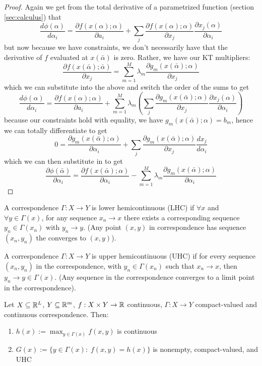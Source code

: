 \begin{proof}
  Again we get from the total derivative of a parametrized function (section
  \ref{sec:calculus}) that 
  \[
  \frac{d \phi(\alpha)}{d \alpha_i}
  = \frac{\partial f(x(\alpha); \alpha)}{\partial a_i}
  + \sum_j 
  \frac{\partial f(x(\alpha);\alpha)}{\partial x_j}
  \frac{\partial x_j(\alpha)}{\partial \alpha_i}
  \]
  but now because we have constraints, we don't necessarily have that
  the derivative of $f$ evaluated at $x(\bar \alpha)$ is zero. Rather,
  we have our KT multipliers:
  \[
  \frac{\partial f(x(\bar \alpha); \bar \alpha)}{\partial x_j}
  = \sum_{m=1}^M \lambda_m \frac{\partial g_m(x(\bar\alpha);\alpha)}{\partial x_j}
  \]
  which we can substitute into the above and switch the order of the
  sums to get
  \[
  \frac{d \phi(\alpha)}{d \alpha_i}
  = \frac{\partial f(x(\alpha); \alpha)}{\partial a_i}
  + \sum_{m=1}^M \lambda_m
  \left(
     \sum_j 
     \frac{\partial g_m(x(\bar\alpha);\alpha)}{\partial x_j}
     \frac{\partial x_j(\alpha)}{\partial \alpha_i}
  \right)
  \]
  because our constraints hold with equality, we have
  $g_m(x(\bar\alpha);\alpha) = b_m$, hence we can totally differentiate to get
  \[
  0 
  = \frac{\partial g_m(x(\bar\alpha);\alpha)}{\partial \alpha_i}
  + \sum_j 
  \frac{\partial g_m(x(\bar\alpha);\alpha)}{\partial x_j}
  \frac{dx_j}{d\alpha_i}
  \]
  which we can then substitute in to get
  \[
  \frac{\partial \phi(\bar \alpha)}{\partial \alpha_i}
  = \frac{\partial f(x(\bar\alpha);\alpha)}{\partial \alpha_i}
  - \sum_{m=1}^M\lambda_m 
  \frac{\partial g_m(x(\bar\alpha);\alpha)}{\partial \alpha_i}
  \]
\end{proof}

\begin{definition}[LHC]
  A correspondence $\Gamma:X \to Y$ is lower hemicontinuous (LHC) if
  $\forall x$ and $\forall y \in \Gamma(x)$, for any sequence $x_n \to
  x$ there exists a corresponding sequence $y_n \in \Gamma(x_n)$ with
  $y_n \to y$. (Any point $(x,y)$ in correspondence has sequence
  $(x_n, y_n)$ the converges to $(x,y)$). 
\end{definition}

\begin{definition}[UHC]
  A correspondence $\Gamma:X \to Y$ is upper hemicontinuous (UHC) if
  for every sequence $(x_n, y_n)$ in the correspondence, with $y_n \in
  \Gamma(x_n)$ such that $x_n \to x$, then $y_n \to y \in
  \Gamma(x)$. (Any sequence in the correspondence converges to a limit
  point in the correspondence).
\end{definition}

\begin{theorem}
  Let $X \subseteq {\mathbb R}^L$, $Y \subseteq {\mathbb R}^m$, $f : X \times Y \to {\mathbb R}$
  continuous, $\Gamma : X \to Y$ compact-valued and continuous
  correspondence. Then:
  \begin{enumerate}[(1)]
  \item $h(x) := \max_{y\in \Gamma(x)}f(x,y)$ is continuous
  \item $G(x) := \{y \in \Gamma(x): \; f(x,y) = h(x)\}$ is nonempty,
    compact-valued, and UHC
  \end{enumerate}
\end{theorem}
